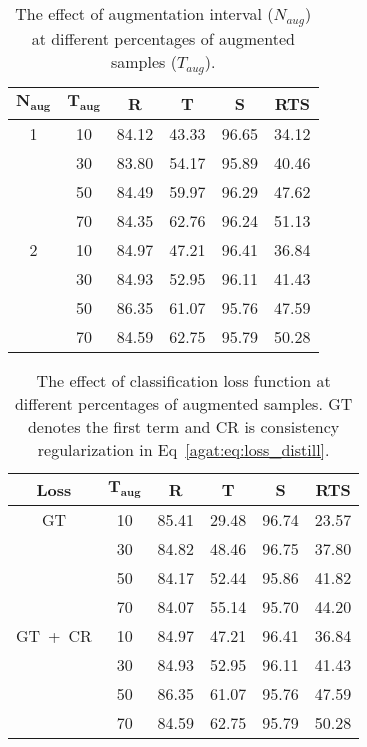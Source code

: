 \begin{table}
    \centering 
    \begin{tabular}{@{}cccccc@{}}
        \toprule
        $\mathbf{N_{aug}}$ & $\mathbf{T_{aug}}$ & \textbf{R} & \textbf{T} & \textbf{S} & \textbf{RTS} \\
        \toprule
        1 & 10 & 84.12 & 43.33 & 96.65 & 34.12 \\
         & 30 & 83.80 & 54.17 & 95.89 & 40.46 \\
         & 50 & 84.49 & 59.97 & 96.29 & 47.62 \\ 
         & 70 & 84.35 & 62.76 & 96.24 & 51.13 \\
        \midrule
        2 & 10 & 84.97 & 47.21 & 96.41 & 36.84 \\
         & 30 & 84.93 & 52.95 & 96.11 & 41.43 \\
         & 50 & 86.35 & 61.07 & 95.76 & 47.59 \\
         & 70 & 84.59 & 62.75 & 95.79 & 50.28\\
        \bottomrule
    \end{tabular}
    \caption{The effect of augmentation interval ($N_{aug}$) at different percentages of augmented samples 
    ($T_{aug}$). 
    }
    \label{}
\end{table}

\begin{table}
    \centering 
    \begin{tabular}{@{}cccccc@{}}
        \toprule
        \textbf{Loss} & $\mathbf{T_{aug}}$ & \textbf{R} & \textbf{T} & \textbf{S} & \textbf{RTS} \\
        \toprule
        GT 
         & 10 & 85.41 & 29.48 & 96.74 & 23.57\\
         & 30 & 84.82 & 48.46 & 96.75 & 37.80\\
         & 50 & 84.17 & 52.44 & 95.86 & 41.82 \\
         & 70 & 84.07 & 55.14 & 95.70 & 44.20 \\
        \midrule
        GT~+~CR
         & 10 & 84.97 & 47.21 & 96.41 & 36.84 \\
         & 30 & 84.93 & 52.95 & 96.11 & 41.43 \\
         & 50 & 86.35 & 61.07 & 95.76 & 47.59 \\ 
         & 70 & 84.59 & 62.75 & 95.79 & 50.28 \\
        \bottomrule
    \end{tabular}
    \caption{
        The effect of classification loss function at different percentages of augmented samples. GT denotes the first term and CR is consistency regularization in Eq~\eqref{agat:eq:loss_distill}.
    }
    \label{tab:mnist_ablation}
\end{table}